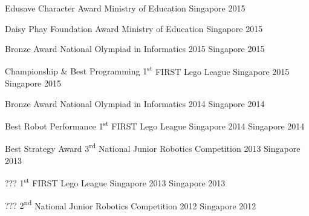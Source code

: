 \begin{cvhonors}

  \cvhonor
    {Edusave Character Award} %
    {Ministry of Education} %
    {Singapore} %
    {2015} %

  \cvhonor
    {Daisy Phay Foundation Award} %
    {Ministry of Education} %
    {Singapore} %
    {2015} %

  \cvhonor
    {Bronze Award} %
    {National Olympiad in Informatics 2015} %
    {Singapore} %
    {2015} %
    
  \cvhonor
    {Championship \& Best Programming 1\textsuperscript{st}} %
    {FIRST Lego League Singapore 2015} %
    {Singapore} %
    {2015} %

  \cvhonor
    {Bronze Award} %
    {National Olympiad in Informatics 2014} %
    {Singapore} %
    {2014} %

  \cvhonor
    {Best Robot Performance 1\textsuperscript{st}} %
    {FIRST Lego League Singapore 2014} %
    {Singapore} %
    {2014} %
    
  \cvhonor
    {Best Strategy Award 3\textsuperscript{rd}} %
    {National Junior Robotics Competition 2013} %
    {Singapore} %
    {2013} %
    
  \cvhonor
    {??? 1\textsuperscript{st}} %
    {FIRST Lego League Singapore 2013} %
    {Singapore} %
    {2013} %
    
  \cvhonor
    {??? 2\textsuperscript{nd}} %
    {National Junior Robotics Competition 2012} %
    {Singapore} %
    {2012} %

\end{cvhonors}

